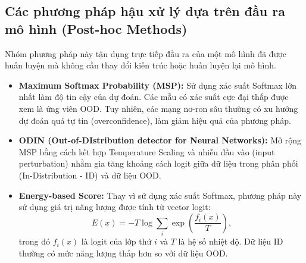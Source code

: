 \subsection{Các phương pháp hậu xử lý dựa trên đầu ra mô hình (Post-hoc Methods)} 
Nhóm phương pháp này tận dụng trực tiếp đầu ra của một mô hình đã được huấn luyện mà không cần thay đổi kiến trúc hoặc huấn luyện lại mô hình. 
\begin{itemize} 
  \item \textbf{Maximum Softmax Probability (MSP):} Sử dụng xác suất Softmax lớn nhất làm độ tin cậy của dự đoán. Các mẫu có xác suất cực đại thấp được xem là ứng viên OOD. Tuy nhiên, các mạng nơ-ron sâu thường có xu hướng dự đoán quá tự tin (overconfidence), làm giảm hiệu quả của phương pháp. 
  \item \textbf{ODIN (Out-of-DIstribution detector for Neural Networks):} Mở rộng MSP bằng cách kết hợp Temperature Scaling và nhiễu đầu vào (input perturbation) nhằm gia tăng khoảng cách logit giữa dữ liệu trong phân phối (In-Distribution - ID) và dữ liệu OOD. 
  \item \textbf{Energy-based Score:} Thay vì sử dụng xác suất Softmax, phương pháp này sử dụng giá trị năng lượng được tính từ vector logit: 
  \[ E(x)=-T\log\sum_i\exp\left(\frac{f_i(x)}{T}\right), \] 
  trong đó $f_i(x)$ là logit của lớp thứ $i$ và $T$ là hệ số nhiệt độ. Dữ liệu ID thường có mức năng lượng thấp hơn so với dữ liệu OOD. 
\end{itemize} 

